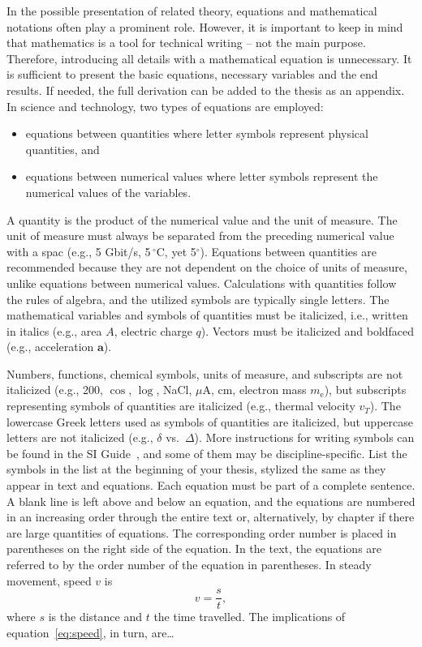 In the possible presentation of related theory, equations and
mathematical notations often play a prominent role. However, it is
important to keep in mind that mathematics is a tool for technical
writing – not the main purpose. Therefore, introducing all details
with a mathematical equation is unnecessary. It is sufficient to
present the basic equations, necessary variables and the end
results. If needed, the full derivation can be added to the thesis as
an appendix. In science and technology, two types of equations are
employed:

\begin{itemize}
\item{equations between quantities where letter symbols represent physical quantities, and}
\item{equations between numerical values where letter symbols represent the numerical values of the variables.}
\end{itemize}

A quantity is the product of the numerical value and the unit of
measure. The unit of measure must always be separated from the
preceding numerical value with a spac (e.g., 5 Gbit/s,  5\,$^\circ$C, yet 5$^\circ$). Equations between quantities are recommended because they are not dependent on the choice of units of measure, unlike equations between numerical values. Calculations with quantities follow the rules of algebra, and the utilized symbols are typically single letters. The mathematical variables and symbols of quantities must be italicized, i.e., written in italics (e.g., area $A$, electric charge $q$). Vectors must be italicized and boldfaced (e.g., acceleration $\mathbf{a}$).

Numbers, functions, chemical symbols, units of measure, and subscripts are not italicized (e.g., 200, $\cos$, $\log$, NaCl, $\mu$A, cm, electron mass $m_\mathrm{e}$), but subscripts representing symbols of quantities are italicized (e.g., thermal velocity $v_\mathit{T}$). The lowercase Greek letters used as symbols of quantities are italicized, but uppercase letters are not italicized (e.g., $\delta$ vs.\ $\Delta$). More instructions for writing symbols can be found in the SI Guide~\cite{SIguide}, and some of them may be discipline-specific.
List the symbols in the list at the beginning of your thesis, stylized the same as they appear in text and equations. Each equation must be part of a complete sentence. A blank line is left above and below an equation, and the equations are numbered in an increasing order through the entire text or, alternatively, by chapter if there are large quantities of equations. The corresponding order number is placed in parentheses on the right side of the equation. In the text, the equations are referred to by the order number of the equation in parentheses.
In steady movement, speed $v$ is
\begin{equation}
    v = \frac{s}{t},
    \label{eq:speed}
\end{equation}
where $s$ is the distance and $t$ the time travelled. The implications of equation~\eqref{eq:speed}, in turn, are\ldots

